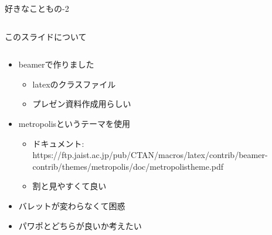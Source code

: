 \documentclass[unicode,12pt,aspectratio=169, dvipdfmx]{beamer}
\begin{document}
\begin{frame}{好きなこともの-2}
\begin{columns}
\begin{column}[]{.5\linewidth}
\begin{center}
                \end{center}
            \end{column}
        \end{columns}
    \end{frame}

    \begin{frame}{このスライドについて}
        \begin{columns}
        \begin{column}{\linewidth}
            \begin{itemize}
            \item beamerで作りました
            \begin{itemize}
                \item latexのクラスファイル
                \item プレゼン資料作成用らしい
            \end{itemize}
            \item metropolisというテーマを使用
            \begin{itemize}
                \item ドキュメント: https://ftp.jaist.ac.jp/pub/CTAN/macros/latex/contrib/beamer-contrib/themes/metropolis/doc/metropolistheme.pdf
                \item 割と見やすくて良い
            \end{itemize}
            \item バレットが変わらなくて困惑
            \item パワポとどちらが良いか考えたい
            \end{itemize}          
        \end{column}
        \end{columns}
    \end{frame}
\end{document}
